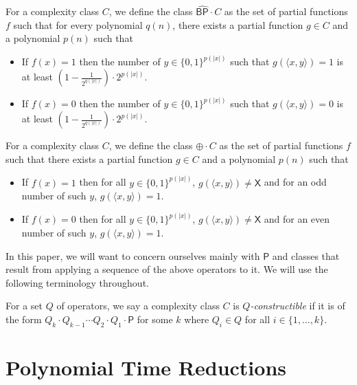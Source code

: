 \documentclass[11pt]{article}
\newcommand{\strongbp}{\widehat{\textsf{BP}}}
\newcommand{\parity}{\oplus}
\newcommand{\p}{\textsf{P}}
\newcommand{\x}{\textsf{X}}
\begin{document}
\begin{definition}\label{opstrongbp}
For a complexity class $C$, we define the class $\strongbp\cdot C$ as the set of partial functions $f$ such that for every polynomial $q(n)$, there exists a partial function $g \in C$ and a polynomial $p(n)$ such that
\begin{itemize}
\item If $f(x) = 1$ then the number of $y \in \{0,1\}^{p(|x|)}$ such that $g(\langle x, y \rangle) = 1$ is at least \linebreak$\left(1 - \frac{1}{2^{q(|x|)}}\right)\cdot 2^{p(|x|)}$.
\item If $f(x) = 0$ then the number of $y \in \{0,1\}^{p(|x|)}$ such that $g(\langle x, y \rangle) = 0$ is at least \linebreak$\left(1 - \frac{1}{2^{q(|x|)}}\right)\cdot 2^{p(|x|)}$.
\end{itemize}
\end{definition}

\begin{definition}\label{opparity}
For a complexity class $C$, we define the class $\parity\cdot C$ as the set of partial functions $f$ such that there exists a partial function $g \in C$ and a polynomial $p(n)$ such that
\begin{itemize}
\item If $f(x) = 1$ then for all $y \in \{0,1\}^{p(|x|)}$, $g(\langle x, y\rangle) \neq \x$ and for an odd number of such $y$, $g(\langle x,y\rangle) = 1$.
\item If $f(x) = 0$ then for all $y \in \{0,1\}^{p(|x|)}$, $g(\langle x, y\rangle) \neq \x$ and for an even number of such $y$, $g(\langle x,y\rangle) = 1$.
\end{itemize}
\end{definition}

In this paper, we will want to concern ourselves mainly with $\p$ and classes that result from applying a sequence of the above operators to it. We will use the following terminology throughout.
\begin{definition}\label{constructible}
For a set $Q$ of operators, we say a complexity class $C$ is \emph{$Q$-constructible} if it is of the form $Q_k \cdot Q_{k-1} \cdots Q_{2} \cdot Q_1 \cdot \p$ for some $k$ where $Q_i \in Q$ for all $i \in \{1,\ldots,k\}$.
\end{definition}

\section{Polynomial Time Reductions}
\end{document}
